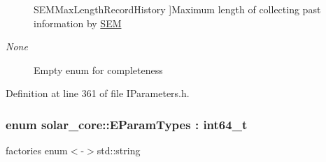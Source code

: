 \begin{Desc}
\begin{description}
{\hypertarget{namespacesolar__core_ac827fdef4412a3c0d5e44d3f31908e49ac75cfee3c5e5c1d3c4b15f53ab4cc718}{}S\+E\+M\+Max\+Length\+Record\+History\label{namespacesolar__core_ac827fdef4412a3c0d5e44d3f31908e49ac75cfee3c5e5c1d3c4b15f53ab4cc718}
}]Maximum length of collecting past information by \hyperlink{classsolar__core_1_1_s_e_m}{S\+E\+M} \item[{\em 
\hypertarget{namespacesolar__core_ac827fdef4412a3c0d5e44d3f31908e49a6adf97f83acf6453d4a6a4b1070f3754}{}None\label{namespacesolar__core_ac827fdef4412a3c0d5e44d3f31908e49a6adf97f83acf6453d4a6a4b1070f3754}
}]Empty enum for completeness \end{description}
\end{Desc}


Definition at line 361 of file I\+Parameters.\+h.

\hypertarget{namespacesolar__core_aa1147341e5ef7a40d68d1bd68e149362}{}
\subsubsection[{E\+Param\+Types}]{\setlength{\rightskip}{0pt plus 5cm}enum {\bf solar\+\_\+core\+::\+E\+Param\+Types} \+: int64\+\_\+t\hspace{0.3cm}{\ttfamily [strong]}}\label{namespacesolar__core_aa1147341e5ef7a40d68d1bd68e149362}
factories enum$<$-\/$>$std\+::string

